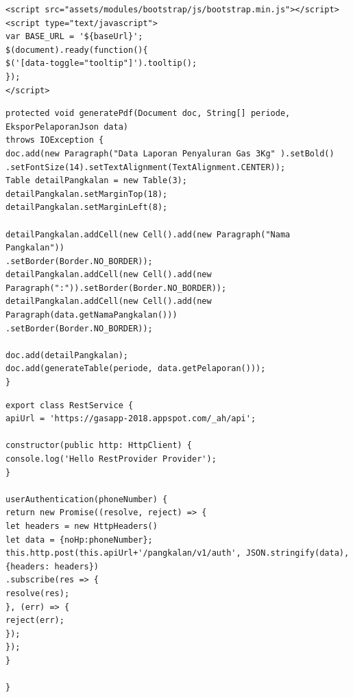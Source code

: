 \begin{lstlisting}[caption=Potongan kode Login memakai email aplikasi berbasis web, label=loginWeb]
<script src="assets/modules/bootstrap/js/bootstrap.min.js"></script>
<script type="text/javascript">
var BASE_URL = '${baseUrl}';
$(document).ready(function(){
$('[data-toggle="tooltip"]').tooltip();
});
</script>

\end{lstlisting}

\begin{lstlisting}[caption=Potongan kode ekspor data aplikasi berbasis web, label=eksporWeb]
protected void generatePdf(Document doc, String[] periode, EksporPelaporanJson data) 
throws IOException {
doc.add(new Paragraph("Data Laporan Penyaluran Gas 3Kg" ).setBold()
.setFontSize(14).setTextAlignment(TextAlignment.CENTER));
Table detailPangkalan = new Table(3);
detailPangkalan.setMarginTop(18);
detailPangkalan.setMarginLeft(8);

detailPangkalan.addCell(new Cell().add(new Paragraph("Nama Pangkalan"))
.setBorder(Border.NO_BORDER));
detailPangkalan.addCell(new Cell().add(new Paragraph(":")).setBorder(Border.NO_BORDER));
detailPangkalan.addCell(new Cell().add(new Paragraph(data.getNamaPangkalan()))
.setBorder(Border.NO_BORDER));

doc.add(detailPangkalan);
doc.add(generateTable(periode, data.getPelaporan()));
}
\end{lstlisting}


\begin{lstlisting}[caption=Potongan kode \textit{model} aplikasi berbasis android, label=modelMobile]
export class RestService {
apiUrl = 'https://gasapp-2018.appspot.com/_ah/api';

constructor(public http: HttpClient) {
console.log('Hello RestProvider Provider');
}

userAuthentication(phoneNumber) {
return new Promise((resolve, reject) => {
let headers = new HttpHeaders()
let data = {noHp:phoneNumber};
this.http.post(this.apiUrl+'/pangkalan/v1/auth', JSON.stringify(data), {headers: headers})
.subscribe(res => {
resolve(res);
}, (err) => {
reject(err);
});
});
}

}

\end{lstlisting}

